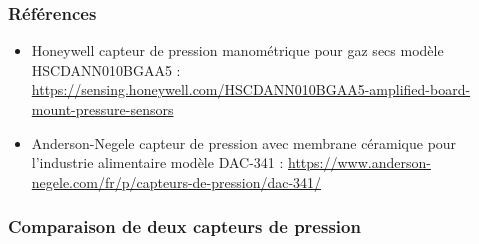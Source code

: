 \documentclass{article}
\begin{document}
    \subsubsection{Références}
    \begin{itemize}
        \item Honeywell capteur de pression manométrique pour gaz secs modèle HSCDANN010BGAA5 : \url{https://sensing.honeywell.com/HSCDANN010BGAA5-amplified-board-mount-pressure-sensors}
        \item Anderson-Negele capteur de pression avec membrane céramique pour l'industrie alimentaire modèle DAC-341 : \url{https://www.anderson-negele.com/fr/p/capteurs-de-pression/dac-341/}
    \end{itemize}

    \subsubsection{Comparaison de deux capteurs de pression}
\end{document}
